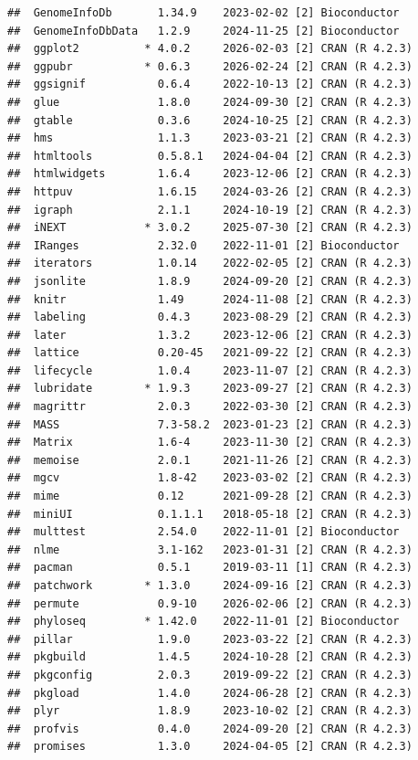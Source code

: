 \documentclass[
]{article}
\begin{document}
\begin{verbatim}
##  GenomeInfoDb       1.34.9    2023-02-02 [2] Bioconductor
##  GenomeInfoDbData   1.2.9     2024-11-25 [2] Bioconductor
##  ggplot2          * 4.0.2     2026-02-03 [2] CRAN (R 4.2.3)
##  ggpubr           * 0.6.3     2026-02-24 [2] CRAN (R 4.2.3)
##  ggsignif           0.6.4     2022-10-13 [2] CRAN (R 4.2.3)
##  glue               1.8.0     2024-09-30 [2] CRAN (R 4.2.3)
##  gtable             0.3.6     2024-10-25 [2] CRAN (R 4.2.3)
##  hms                1.1.3     2023-03-21 [2] CRAN (R 4.2.3)
##  htmltools          0.5.8.1   2024-04-04 [2] CRAN (R 4.2.3)
##  htmlwidgets        1.6.4     2023-12-06 [2] CRAN (R 4.2.3)
##  httpuv             1.6.15    2024-03-26 [2] CRAN (R 4.2.3)
##  igraph             2.1.1     2024-10-19 [2] CRAN (R 4.2.3)
##  iNEXT            * 3.0.2     2025-07-30 [2] CRAN (R 4.2.3)
##  IRanges            2.32.0    2022-11-01 [2] Bioconductor
##  iterators          1.0.14    2022-02-05 [2] CRAN (R 4.2.3)
##  jsonlite           1.8.9     2024-09-20 [2] CRAN (R 4.2.3)
##  knitr              1.49      2024-11-08 [2] CRAN (R 4.2.3)
##  labeling           0.4.3     2023-08-29 [2] CRAN (R 4.2.3)
##  later              1.3.2     2023-12-06 [2] CRAN (R 4.2.3)
##  lattice            0.20-45   2021-09-22 [2] CRAN (R 4.2.3)
##  lifecycle          1.0.4     2023-11-07 [2] CRAN (R 4.2.3)
##  lubridate        * 1.9.3     2023-09-27 [2] CRAN (R 4.2.3)
##  magrittr           2.0.3     2022-03-30 [2] CRAN (R 4.2.3)
##  MASS               7.3-58.2  2023-01-23 [2] CRAN (R 4.2.3)
##  Matrix             1.6-4     2023-11-30 [2] CRAN (R 4.2.3)
##  memoise            2.0.1     2021-11-26 [2] CRAN (R 4.2.3)
##  mgcv               1.8-42    2023-03-02 [2] CRAN (R 4.2.3)
##  mime               0.12      2021-09-28 [2] CRAN (R 4.2.3)
##  miniUI             0.1.1.1   2018-05-18 [2] CRAN (R 4.2.3)
##  multtest           2.54.0    2022-11-01 [2] Bioconductor
##  nlme               3.1-162   2023-01-31 [2] CRAN (R 4.2.3)
##  pacman             0.5.1     2019-03-11 [1] CRAN (R 4.2.3)
##  patchwork        * 1.3.0     2024-09-16 [2] CRAN (R 4.2.3)
##  permute            0.9-10    2026-02-06 [2] CRAN (R 4.2.3)
##  phyloseq         * 1.42.0    2022-11-01 [2] Bioconductor
##  pillar             1.9.0     2023-03-22 [2] CRAN (R 4.2.3)
##  pkgbuild           1.4.5     2024-10-28 [2] CRAN (R 4.2.3)
##  pkgconfig          2.0.3     2019-09-22 [2] CRAN (R 4.2.3)
##  pkgload            1.4.0     2024-06-28 [2] CRAN (R 4.2.3)
##  plyr               1.8.9     2023-10-02 [2] CRAN (R 4.2.3)
##  profvis            0.4.0     2024-09-20 [2] CRAN (R 4.2.3)
##  promises           1.3.0     2024-04-05 [2] CRAN (R 4.2.3)

\end{verbatim}
\end{document}
